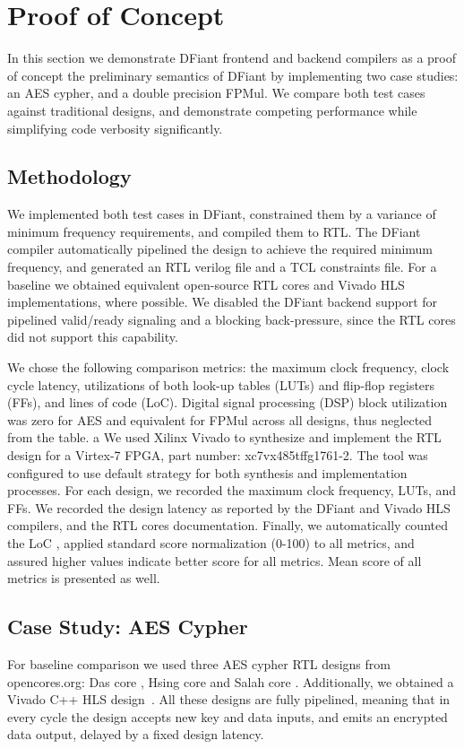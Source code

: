 \section{Proof of Concept}
\label{sec:evaluation}
In this section we demonstrate DFiant frontend and backend compilers as a proof of concept the preliminary semantics of DFiant by implementing two case studies: an AES cypher, and a double precision FPMul. We compare both test cases against traditional designs, and demonstrate competing performance while simplifying code verbosity significantly. 

\subsection{Methodology}
We implemented both test cases in DFiant, constrained them by a variance of minimum frequency requirements, and compiled them to RTL. The DFiant compiler automatically pipelined the design to achieve the required minimum frequency, and generated an RTL verilog file and a TCL constraints file. For a baseline we obtained equivalent open-source RTL cores and Vivado HLS implementations, where possible. We disabled the DFiant backend support for pipelined valid/ready signaling and a blocking back-pressure, since the RTL cores did not support this capability.

We chose the following comparison metrics: the maximum clock frequency, clock cycle latency, utilizations of both look-up tables (LUTs) and flip-flop registers (FFs), and lines of code (LoC). Digital signal processing (DSP) block utilization was zero for AES and equivalent for FPMul across all designs, thus neglected from the table. a We used Xilinx Vivado to synthesize and implement the RTL design for a Virtex-7 FPGA, part number: xc7vx485tffg1761-2. The tool was configured to use default strategy for both synthesis and implementation processes. For each design, we recorded the maximum clock frequency, LUTs, and FFs. We recorded the design latency as reported by the DFiant and Vivado HLS compilers, and the RTL cores documentation. Finally, we automatically counted the LoC \cite{danial2009cloc}, applied standard score normalization (0-100) to all metrics, and assured higher values indicate better score for all metrics. Mean score of all metrics is presented as well.

\subsection{Case Study: AES Cypher}
For baseline comparison we used three AES cypher RTL designs from opencores.org: Das core \cite{das2010fully}, Hsing core \cite{hsing2013aes} and Salah core \cite{salah2013aespipe}. Additionally, we obtained a Vivado C++ HLS design~\cite{oflynn2014rapid}. All these designs are fully pipelined, meaning that in every cycle the design accepts new key and data inputs, and emits an encrypted data output, delayed by a fixed design latency.

